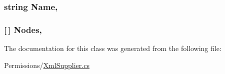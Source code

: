 \subsubsection[{Name}]{\setlength{\rightskip}{0pt plus 5cm}string Name\hspace{0.3cm}{\ttfamily [get]}, {\ttfamily [set]}}\label{classOTA_1_1Permissions_1_1XmlGroup_a7ee9065718e6628dc7791b756fa6c0f9}
\hypertarget{classOTA_1_1Permissions_1_1XmlGroup_ab61d6546169a00b2514bab86c33e487d}{}
\subsubsection[{Nodes}]{ \mbox{[}$\,$\mbox{]} Nodes\hspace{0.3cm}{\ttfamily [get]}, {\ttfamily [set]}}\label{classOTA_1_1Permissions_1_1XmlGroup_ab61d6546169a00b2514bab86c33e487d}


The documentation for this class was generated from the following file\+:\begin{DoxyCompactItemize}
\item 
Permissions/\hyperlink{XmlSupplier_8cs}{Xml\+Supplier.\+cs}\end{DoxyCompactItemize}
